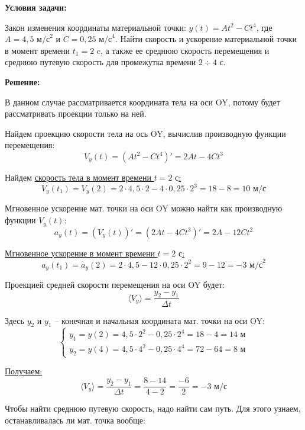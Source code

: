 \documentclass[17pt]{extarticle}
\begin{document}
\textbf{Условия задачи:}

Закон изменения координаты материальной точки: $y(t) = At^2-Ct^4$, где $A = 4,5$ $\text{м/с}^2$ и $C = 0,25$ $\text{м/с}^4$.
Найти скорость и ускорение материальной точки в момент времени $t_1 = 2$ c, а также ее среднюю скорость перемещения и среднюю путевую скорость для промежутка времени $2\div4$ с.

\textbf{Решение:}

В данном случае рассматривается координата тела на оси OY, потому будет рассматривать проекции только на ней.

\vspace{2cm}

Найдем проекцию скорости тела на ось OY, вычислив производную функции перемещения:
$$
V_y(t) = (At^2-Ct^4)' = 2At - 4Ct^3
$$

Найдем \uline{скорость тела в момент времени $t=2\text{ с}$:}
$$
V_y(t_1) = V_y(2) = 2 \cdot 4,5 \cdot 2 - 4 \cdot 0,25 \cdot 2^3 = 18 - 8 = 10 \text{ м/с}
$$

\vspace{2cm}

Мгновенное ускорение мат. точки на оси OY можно найти как производную функции $V_y(t)$:
$$
a_y(t) = (V_y(t))' = (2At-4Ct^3)' = 2A - 12Ct^2
$$

\uline{Мгновенное ускорение в момент времени $t=2\text{ с}$:}
$$
a_y(t_1) = a_y(2) = 2 \cdot 4,5 - 12 \cdot 0,25 \cdot 2^2 = 9 - 12 = -3 \text{ м/с}^2
$$

\vspace{2cm}

Проекцией средней скорости перемещения на оси OY будет:
$$
\langle V_y \rangle = \frac{y_2 - y_1}{\Delta t} 
$$

Здесь $y_2$ и $y_1$ -- конечная и начальная координата мат. точки на оси OY:
$$
\begin{cases}
	y_1 = y(2) = 4,5 \cdot 2^2 - 0,25 \cdot 2^4 = 18 - 4 = 14 \text{ м} \\
	y_2 = y(4) = 4,5 \cdot 4^2 - 0,25 \cdot 4^4 = 72 - 64 = 8 \text{ м}
\end{cases}
$$

\uline{Получаем:}
$$
\langle V_y \rangle = \frac{y_2 - y_1}{\Delta t} = \frac{8 - 14}{4 - 2}  = \frac{-6}{2} = -3 \text{ м/с}
$$

\vspace{2cm}

Чтобы найти среднюю путевую скорость, надо найти сам путь. Для этого узнаем, останавливалась ли мат. точка вообще:
\end{document}
